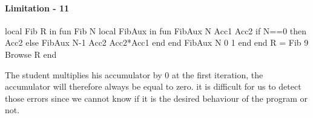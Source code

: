 \documentclass[11pt,a4paper,twoside,openright]{report}
\begin{document}
\paragraph{Limitation - 11}
\begin{OZ}

 local Fib R in
    fun {Fib N}
        local FibAux in
            fun {FibAux N Acc1 Acc2}
				if N==0 then Acc2
				else
				    {FibAux N-1 Acc2 Acc2*Acc1}
				end
			end
            {FibAux N 0 1}
    	end
    end
    R = {Fib 9}
	{Browse R}
end

\end{OZ}

The student multiplies his accumulator by 0 at the first iteration, the 
accumulator 
will therefore always be equal to zero. it is difficult for us to detect those 
errors since 
we cannot know if it is the desired behaviour of the program or not. 
\end{document}
